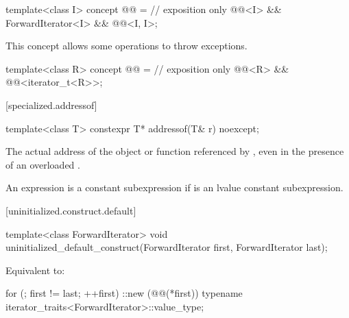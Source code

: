 \begin{itemdecl}
template<class I>
concept @@ = // exposition only
  @@<I> &&
  ForwardIterator<I> &&
  @@<I, I>;
\end{itemdecl}

\begin{itemdescr}
\pnum
\begin{note}
This concept allows some 
operations to throw exceptions.
\end{note}
\end{itemdescr}

\begin{itemdecl}
template<class R>
concept @@ = // exposition only
  @@<R> &&
  @@<iterator_t<R>>;
\end{itemdecl}

[specialized.addressof]{}

%
\begin{itemdecl}
template<class T> constexpr T* addressof(T& r) noexcept;
\end{itemdecl}

\begin{itemdescr}
\pnum
\returns The actual address of the object or function referenced by , even in the
presence of an overloaded .

\pnum
\remarks An expression 
is a constant subexpression
if  is an lvalue constant subexpression.
\end{itemdescr}

[uninitialized.construct.default]{}

%
\begin{itemdecl}
template<class ForwardIterator>
  void uninitialized_default_construct(ForwardIterator first, ForwardIterator last);
\end{itemdecl}

\begin{itemdescr}
\pnum
\effects
Equivalent to:
\begin{codeblock}
for (; first != last; ++first)
  ::new (@@(*first))
    typename iterator_traits<ForwardIterator>::value_type;
\end{codeblock}
\end{itemdescr}

